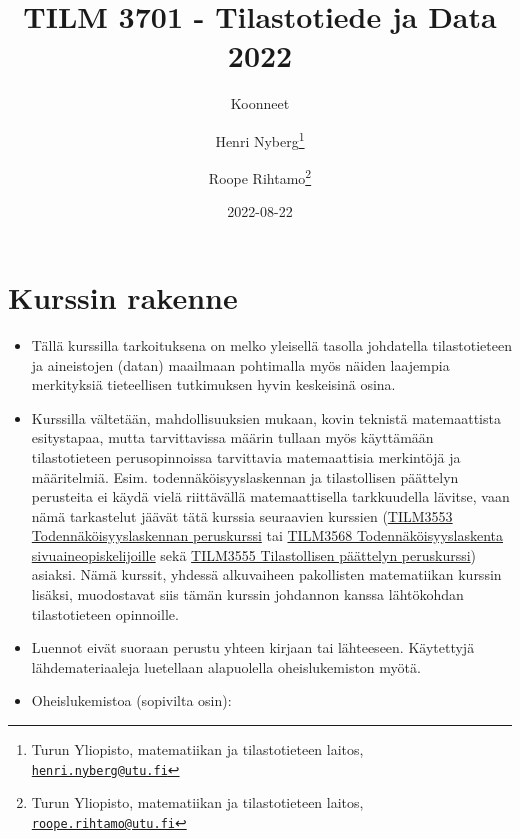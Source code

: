 \documentclass[
]{book}
\title{TILM 3701 - Tilastotiede ja Data 2022}
\author{Koonneet \and Henri Nyberg\footnote{Turun Yliopisto, matematiikan ja tilastotieteen laitos, \href{mailto:henri.nyberg@utu.fi}{\nolinkurl{henri.nyberg@utu.fi}}} \and Roope Rihtamo\footnote{Turun Yliopisto, matematiikan ja tilastotieteen laitos, \href{mailto:roope.rihtamo@utu.fi}{\nolinkurl{roope.rihtamo@utu.fi}}}}
\date{2022-08-22}
\begin{document}
\maketitle

{
\setcounter{tocdepth}{1}
\tableofcontents
}
\hypertarget{kurssin-rakenne}{%
\chapter*{Kurssin rakenne}\label{kurssin-rakenne}}

\begin{itemize}
\item
  Tällä kurssilla tarkoituksena on melko yleisellä tasolla johdatella tilastotieteen ja aineistojen (datan) maailmaan pohtimalla myös näiden laajempia merkityksiä tieteellisen tutkimuksen hyvin keskeisinä osina.
\item
  Kurssilla vältetään, mahdollisuuksien mukaan, kovin teknistä matemaattista esitystapaa, mutta tarvittavissa määrin tullaan myös käyttämään tilastotieteen perusopinnoissa tarvittavia matemaattisia merkintöjä ja määritelmiä. Esim. todennäköisyyslaskennan ja tilastollisen päättelyn perusteita ei käydä vielä riittävällä matemaattisella tarkkuudella lävitse, vaan nämä tarkastelut jäävät tätä kurssia seuraavien kurssien (\href{https://opas.peppi.utu.fi/fi/opintojakso/TILM3553/1734?period=2022-2024}{TILM3553 Todennäköisyyslaskennan peruskurssi} tai \href{https://opas.peppi.utu.fi/fi/opintojakso/TILM3568/3385?period=2022-2024}{TILM3568 Todennäköisyyslaskenta sivuaineopiskelijoille} sekä \href{https://opas.peppi.utu.fi/fi/opintojakso/TILM3555/1731?period=2022-2024}{TILM3555 Tilastollisen päättelyn peruskurssi}) asiaksi. Nämä kurssit, yhdessä alkuvaiheen pakollisten matematiikan kurssin lisäksi, muodostavat siis tämän kurssin johdannon kanssa lähtökohdan tilastotieteen opinnoille.
\item
  Luennot eivät suoraan perustu yhteen kirjaan tai lähteeseen. Käytettyjä lähdemateriaaleja luetellaan alapuolella oheislukemiston myötä.
\item
  Oheislukemistoa (sopivilta osin):


\end{itemize}
\end{document}
